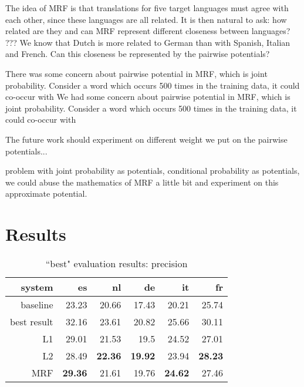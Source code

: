 \documentclass[11pt,letterpaper]{article}
\begin{document}
The idea of MRF is that translations for five target languages must agree with
each other, since these languages are all related.  It is then natural to ask:
how related are they and can MRF represent different closeness between
languages?  ???  We know that Dutch is more related to German than with
Spanish, Italian and French. Can this closeness be represented by the pairwise
potentials?


There was some concern about pairwise potential in MRF, which is joint probability. Consider a word which occurs 500 times in the training data, it could co-occur with
We had some concern about pairwise potential in MRF, which is joint
probability. Consider a word which occurs 500 times in the training data, it
could co-occur with

The future work should experiment on different weight we put on the pairwise
potentials...

problem with joint probability as potentials, conditional probability as
potentials, we could abuse the mathematics of MRF a little bit and experiment
on this approximate potential.

\section{Results}
\begin{table*}[t!]
  \begin{center}
    \begin{tabular}{|r|r|r|r|r|r|}
      \hline
      system   & es    & nl    & de    &  it   & fr \\
      \hline
      baseline & 23.23          & 20.66          & 17.43          & 20.21          & 25.74 \\
   best result & 32.16          & 23.61          & 20.82          & 25.66          & 30.11 \\
      \hline
            L1 & 29.01          & 21.53          & 19.5           & 24.52          & 27.01 \\
            L2 & 28.49          & \textbf{22.36} & \textbf{19.92} & 23.94          & \textbf{28.23} \\
           MRF & \textbf{29.36} & 21.61          & 19.76          & \textbf{24.62} & 27.46 \\
      \hline
    \end{tabular}
  \caption{``best" evaluation results: precision}
  \label{table:resultsbest}
  \end{center}
\end{table*}
\end{document}
